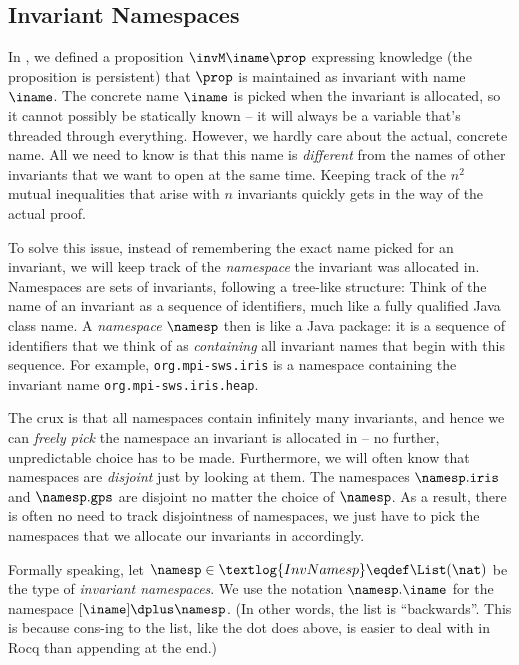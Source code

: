 \subsection{Invariant Namespaces}
\label{sec:namespaces}

In , we defined a proposition $\invM\iname\prop$ expressing knowledge (\ie the proposition is persistent) that $\prop$ is maintained as invariant with name $\iname$.
The concrete name $\iname$ is picked when the invariant is allocated, so it cannot possibly be statically known -- it will always be a variable that's threaded through everything.
However, we hardly care about the actual, concrete name.
All we need to know is that this name is \emph{different} from the names of other invariants that we want to open at the same time.
Keeping track of the $n^2$ mutual inequalities that arise with $n$ invariants quickly gets in the way of the actual proof.

To solve this issue, instead of remembering the exact name picked for an invariant, we will keep track of the \emph{namespace} the invariant was allocated in.
Namespaces are sets of invariants, following a tree-like structure:
Think of the name of an invariant as a sequence of identifiers, much like a fully qualified Java class name.
A \emph{namespace} $\namesp$ then is like a Java package: it is a sequence of identifiers that we think of as \emph{containing} all invariant names that begin with this sequence. For example, \texttt{org.mpi-sws.iris} is a namespace containing the invariant name \texttt{org.mpi-sws.iris.heap}.

The crux is that all namespaces contain infinitely many invariants, and hence we can \emph{freely pick} the namespace an invariant is allocated in -- no further, unpredictable choice has to be made.
Furthermore, we will often know that namespaces are \emph{disjoint} just by looking at them.
The namespaces $\namesp.\texttt{iris}$ and $\namesp.\texttt{gps}$ are disjoint no matter the choice of $\namesp$.
As a result, there is often no need to track disjointness of namespaces, we just have to pick the namespaces that we allocate our invariants in accordingly.

Formally speaking, let $\namesp \in \textlog{InvNamesp} \eqdef \List(\nat)$ be the type of \emph{invariant namespaces}.
We use the notation $\namesp.\iname$ for the namespace $[\iname] \dplus \namesp$.
(In other words, the list is ``backwards''. This is because cons-ing to the list, like the dot does above, is easier to deal with in Rocq than appending at the end.)

